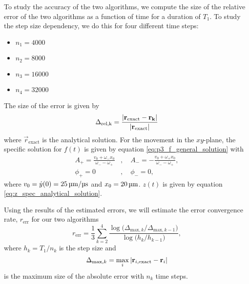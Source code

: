 To study the accuracy of the two algorithms, we compute the size of the relative error of the two algorithms as a function of time for a duration of $T_1$. To study the step size dependency, we do this for four different time steps:
\begin{itemize}
    \item[] $n_1 = 4000$
    \item[] $n_2 = 8000$
    \item[] $n_3 = 16000$
    \item[] $n_4 = 32000$
\end{itemize}
The size of the error is given by 
\begin{equation}\label{eq:relative_error_size}
    \Delta_\mathrm{rel,k} = \frac{\abs{\mathbf{r}_\mathrm{exact} - \mathbf{r_k}}}{\abs{\mathbf{r}_\mathrm{exact}}}
\end{equation}
where $\vec{r}_\mathrm{exact}$ is the analytical solution. For the movement in the $xy$-plane, the specific solution for $f(t)$ is given by equation \eqref{eq:p3_f_general_solution} with 
\begin{equation} \label{eq:xy_amplitudes_spec_analytical_solution}
    \begin{split}
        A_+ = \frac{v_0 + \omega_- x_0}{\omega_- - \omega_+}&,\quad A_- = - \frac{v_0 + \omega_+ x_0}{\omega_- - \omega_+}, \\
        \phi_+ =0&,\quad \phi_- =0,
    \end{split}
\end{equation}
where $v_0=\dot{y}(0)=25\,\mums$ and $x_0=20\,\mum$. $z(t)$ is given by equation \eqref{eq:z_spec_analytical_solution}.




Using the results of the estimated errors, we will estimate the error convergence rate, $r_\mathrm{err}$ for our two algorithms 
\begin{equation}\label{eq:error_convergence_rate}
    r_\mathrm{err} = \frac{1}{3} \sum_{k=2}^{4} \frac{\log{\big(\Delta_{\mathrm{max}, k} /\Delta_{\mathrm{max}, k-1}\big)}}{\log{\big(h_k/h_{k-1} \big)}},
\end{equation}
where $h_k =T_1/n_k$ is the step size and
\begin{equation}\label{eq:abs_error}
    \Delta_{\mathrm{max}, k} = \max_{i}\abs{\mathbf{r}_{i, \mathrm{exact}} - \mathbf{r}_i}
\end{equation}
is the maximum size of the absolute error with $n_k$ time steps. 


